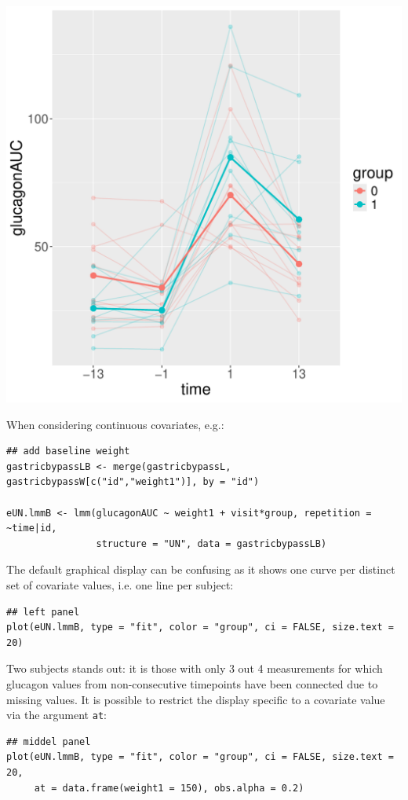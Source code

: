 \documentclass[12pt]{article}
\begin{document}
\begin{minipage}{0.3\linewidth}
\begin{center}
\includegraphics[width=\textwidth]{./figures/fitAll-autoplot.pdf}
\end{center}
\end{minipage}


When considering continuous covariates, e.g.:
\lstset{language=r,label= ,caption= ,captionpos=b,numbers=none}
\begin{lstlisting}
## add baseline weight
gastricbypassLB <- merge(gastricbypassL, gastricbypassW[c("id","weight1")], by = "id")

eUN.lmmB <- lmm(glucagonAUC ~ weight1 + visit*group, repetition = ~time|id,
                structure = "UN", data = gastricbypassLB)
\end{lstlisting}


\noindent The default graphical display can be confusing as it shows
one curve per distinct set of covariate values, i.e. one line per
subject:
\lstset{language=r,label= ,caption= ,captionpos=b,numbers=none}
\begin{lstlisting}
## left panel
plot(eUN.lmmB, type = "fit", color = "group", ci = FALSE, size.text = 20)
\end{lstlisting}

Two subjects stands out: it is those with only 3 out 4 measurements
for which glucagon values from non-consecutive timepoints have been
connected due to missing values. It is possible to restrict the
display specific to a covariate value via the argument \texttt{at}:
\lstset{language=r,label= ,caption= ,captionpos=b,numbers=none}
\begin{lstlisting}
## middel panel
plot(eUN.lmmB, type = "fit", color = "group", ci = FALSE, size.text = 20,
     at = data.frame(weight1 = 150), obs.alpha = 0.2)
\end{lstlisting}
\end{document}
